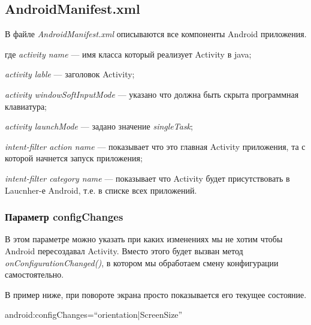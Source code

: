 \subsection{AndroidManifest.xml}

В файле \textit{AndroidManifest.xml} описываются все компоненты Android приложения.
 

\begin{ESKDexplanation}
\item[где ] \textit{activity name} --- имя класса который реализует Activity в java;
\item \textit{activity lable} --- заголовок Activity;
\item \textit{activity windowSoftInputMode} --- указано что должна быть скрыта программная клавиатура;
\item \textit{activity launchMode} --- задано значение \textit{singleTask};
\item \textit{intent-filter action name} --- показывает что это главная Activity приложения, та с которой начнется запуск приложения;
\item \textit{intent-filter category name} --- показывает что Activity будет присутствовать в Laucnher-е Android, т.е. в списке всех приложений. 
\end{ESKDexplanation}

\subsubsection{Параметр configChanges}
	В этом параметре можно указать при каких изменениях мы не хотим чтобы Android пересоздавал Activity. Вместо этого будет вызван метод \textit{onConfigurationChanged()}, в котором мы обработаем смену конфигурации самостоятельно.
	 
	 
В пример ниже, при повороте экрана просто показывается его текущее состояние.
	\begin{center}
	android:configChanges=``orientation|ScreenSize''
	\end{center}
	
	
	
	
